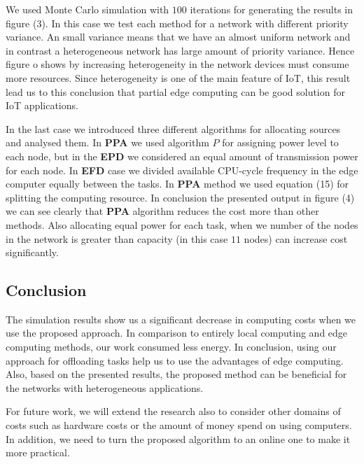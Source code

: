 \documentclass[12pt,final,3p]{CSP}
\begin{document}
We used Monte Carlo simulation with $100$ iterations for generating the results in figure (3). In this case we test each method for a network with different priority variance. An small variance means that we have an almost uniform network and in contrast a heterogeneous network has large amount of priority variance. Hence figure o shows by increasing heterogeneity in the network devices must consume more resources. Since heterogeneity is one of the main feature of IoT, this result lead us to this conclusion that partial edge computing can be good solution for IoT applications. 

In the last case we introduced three different algorithms for allocating sources and analysed them. In \textbf{PPA} we used algorithm $P$ for assigning power level to each node, but in the \textbf{EPD} we considered an equal amount of transmission power for each node. In \textbf{EFD} case we divided available CPU-cycle frequency in the edge computer equally between the tasks. In \textbf{PPA} method we used equation (15) for splitting the computing resource. In conclusion the presented output in figure (4) we can see clearly that \textbf{PPA} algorithm reduces the cost more than other methods. Also allocating equal power for each task, when we number of the nodes in the network is greater than capacity (in this case $11$ nodes) can increase cost significantly.   


\subsection{Conclusion}
The simulation results show us a significant decrease in computing costs when we use the proposed approach. In comparison to entirely local computing and edge computing methods, our work consumed less energy. In conclusion, using our approach for offloading tasks help us to use the advantages of edge computing. Also, based on the presented results, the proposed method can be beneficial for the networks with heterogeneous applications.

For future work, we will extend the research also to consider other domains of costs such as hardware costs or the amount of money spend on using computers. In addition, we need to turn the proposed algorithm to an online one to make it more practical. 
\end{document}
